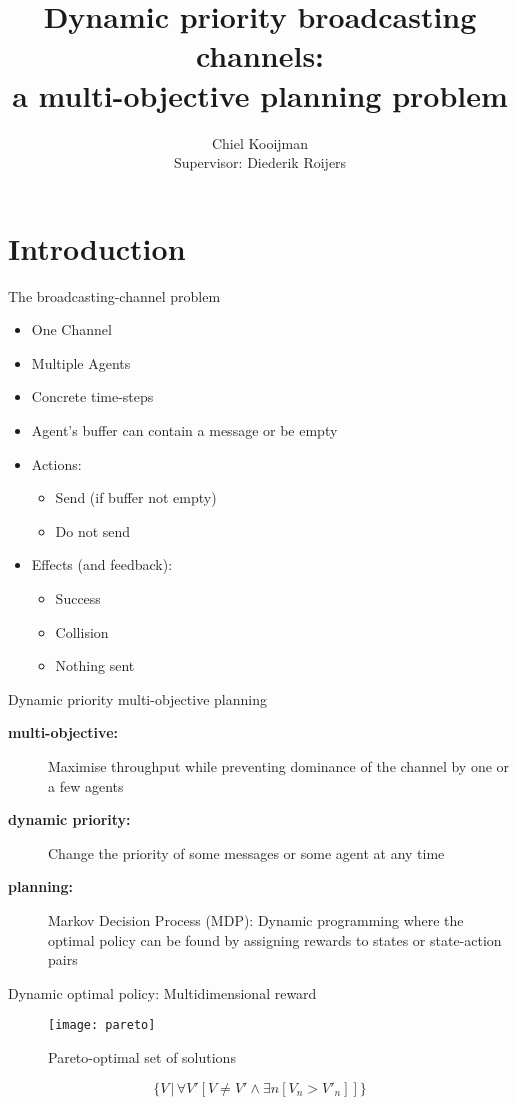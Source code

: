 \documentclass{beamer}
\author{Chiel Kooijman\\ Supervisor: Diederik Roijers}
\title{Dynamic priority broadcasting channels:\\a multi-objective planning problem}
\begin{document}
\frame{\titlepage}


\section{Introduction}
\begin{frame}{The broadcasting-channel problem}
	\begin{itemize}
		\item One Channel
		\item Multiple Agents
		\item Concrete time-steps
		\item Agent's buffer can contain a message or be empty
		\item Actions:
			\begin{itemize}
				\item Send (if buffer not empty)
				\item Do not send
			\end{itemize}
		\item Effects (and feedback):
			\begin{itemize}
				\item Success
				\item Collision
				\item Nothing sent
			\end{itemize}
	\end{itemize}
	\cite{ooi1996decentralized}
\end{frame}


\begin{frame}{Dynamic priority multi-objective planning}
	\begin{description}
		\item[\bf multi-objective:] Maximise throughput while preventing
			dominance of the channel by one or a few agents
			\cite{barrett2008learning}
		\item[\bf dynamic priority:] Change the priority of some messages or some
			agent at any time \cite{natarajan2005dynamic}
		\item[\bf planning:] Markov Decision Process (MDP): Dynamic programming
			where the optimal policy can be found by assigning rewards to states
			or state-action pairs \cite{hansen2004dynamic}
	\end{description}
\end{frame}

\begin{frame}{Dynamic optimal policy: Multidimensional reward}

	\begin{figure}
		\caption{Pareto-optimal set of solutions}
		\texttt{[image: pareto]}
	   \label{fig:pareto}
	\end{figure}

	\begin{equation}
		\label{eq:pareto}
		\Big\{ V\, \Big| \, \forall V'[ V \neq V' \land \exists n [V_n > V'_n]] \Big\}
	\end{equation}
	\cite{vamplew2011empirical}
\end{frame}
\end{document}
